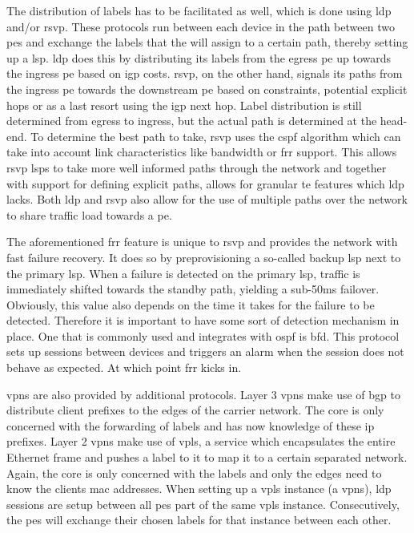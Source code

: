 The distribution of labels has to be facilitated as well, which is done using \ac{ldp} and/or \ac{rsvp}. These protocols run between each device in the path between two \acp{pe} and exchange the labels that the will assign to a certain path, thereby setting up a \ac{lsp}. \ac{ldp} does this by distributing its labels from the egress \ac{pe} up towards the ingress \ac{pe} based on \ac{igp} costs. \ac{rsvp}, on the other hand, signals its paths from the ingress \ac{pe} towards the downstream \ac{pe} based on constraints, potential explicit hops or as a last resort using the \ac{igp} next hop. Label distribution is still determined from egress to ingress, but the actual path is determined at the head-end. To determine the best path to take, \ac{rsvp} uses the \ac{cspf} algorithm which can take into account link characteristics like bandwidth or \ac{frr} support. This allows \ac{rsvp} \acp{lsp} to take more well informed paths through the network and together with support for defining explicit paths, allows for granular \ac{te} features which \ac{ldp} lacks. Both \ac{ldp} and \ac{rsvp} also allow for the use of multiple paths over the network to share traffic load towards a \ac{pe}.

The aforementioned \ac{frr} feature is unique to \ac{rsvp} and provides the network with fast failure recovery. It does so by preprovisioning a so-called backup \ac{lsp} next to the primary \ac{lsp}. When a failure is detected on the primary \ac{lsp}, traffic is immediately shifted towards the standby path, yielding a sub-50ms failover. Obviously, this value also depends on the time it takes for the failure to be detected. Therefore it is important to have some sort of detection mechanism in place. One that is commonly used and integrates with \ac{ospf} is \ac{bfd}. This protocol sets up sessions between devices and triggers an alarm when the session does not behave as expected. At which point \ac{frr} kicks in.

\acp{vpn} are also provided by additional protocols. Layer 3 \acp{vpn} make use of \ac{bgp} to distribute client prefixes to the edges of the carrier network. The core is only concerned with the forwarding of labels and has now knowledge of these \acs{ip} prefixes. Layer 2 \acp{vpn} make use of \ac{vpls}, a service which encapsulates the entire Ethernet frame and pushes a label to it to map it to a certain separated network. Again, the core is only concerned with the labels and only the edges need to know the clients \acs{mac} addresses. When setting up a \ac{vpls} instance (a \acp{vpn}), \ac{ldp} sessions are setup between all \acp{pe} part of the same \ac{vpls} instance. Consecutively, the \acp{pe} will exchange their chosen labels for that instance between each other.

